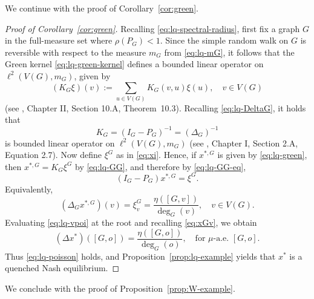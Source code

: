 \documentclass[11pt]{article}
\newcommand{\be}{\begin{equation}}
\newcommand{\ee}{\end{equation}}
\numberwithin{equation}{section}
\begin{document}
We continue with the proof of Corollary~\ref{cor:green}.

\begin{proof}[Proof of Corollary~\ref{cor:green}]
Recalling \eqref{eq:lq-spectral-radius}, first fix a graph \(G\) in the full-measure set where \(\rho(P_G)<1\). Since the simple random walk on \(G\) is reversible with respect to the measure \(m_G\) from \eqref{eq:lq-mG}, it follows that the Green kernel \eqref{eq:lq-green-kernel} defines a bounded linear operator on \(\ell^2(V(G),m_G)\), given by
\begin{equation}\label{eq:lq-GG}
(K_G \xi)(v):=\sum_{u\in V(G)}K_G(v,u)\xi(u),\quad v\in V(G)
\end{equation}
(see \cite{woess2000random}, Chapter II, Section 10.A, Theorem~10.3). Recalling \eqref{eq:lq-DeltaG}, it holds that 
\be\label{eq:lq-GG-eq}
K_G=(I_G-P_G)^{-1}=(\Delta_G)^{-1}
\ee
is bounded linear operator on \(\ell^2(V(G),m_G)\) (see \cite{woess2000random}, Chapter I, Section 2.A, Equation 2.7). Now define $\xi^G$ as in \eqref{eq:xi}. Hence, if \(x^{\ast,G}\) is given by \eqref{eq:lq-green}, then
$x^{\ast,G}=K_G \xi^G$ by \eqref{eq:lq-GG}, and therefore by \eqref{eq:lq-GG-eq},
\[
(I_G-P_G)x^{\ast,G}=\xi^G.
\]
Equivalently,
\be\label{eq:lq-vpoi}
(\Delta_G x^{\ast,G})(v)=\xi^G_v=\frac{\eta([G,v])}{\deg_G(v)},
\quad v\in V(G).
\ee
Evaluating \eqref{eq:lq-vpoi} at the root and recalling \eqref{eq:xGv}, we obtain
\[
(\Delta x^\ast)([G,o])=\frac{\eta([G,o])}{\deg_G(o)},
\quad \text{for } \mu\text{-a.e. } [G,o].
\]
Thus \eqref{eq:lq-poisson} holds, and Proposition~\ref{prop:lq-example} yields that \(x^\ast\) is a quenched Nash equilibrium.
\end{proof}


We conclude with the proof of Proposition~\ref{prop:W-example}.
\end{document}

